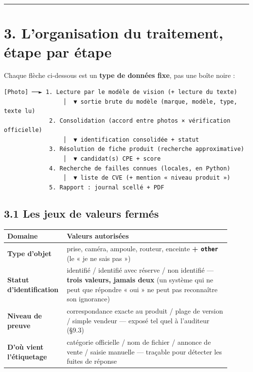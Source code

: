 \documentclass[11pt,a4paper]{article}
\begin{document}
\medskip\hrule\medskip
\section*{3. L'organisation du traitement, étape par étape}
Chaque flèche ci-dessous est un \textbf{type de données fixe}, pas une boîte noire :

\begin{Verbatim}[fontsize=\small]
[Photo] ──► 1. Lecture par le modèle de vision (+ lecture du texte)
                 │  ▼ sortie brute du modèle (marque, modèle, type, texte lu)
             2. Consolidation (accord entre photos × vérification officielle)
                 │  ▼ identification consolidée + statut
             3. Résolution de fiche produit (recherche approximative)
                 │  ▼ candidat(s) CPE + score
             4. Recherche de failles connues (locales, en Python)
                 │  ▼ liste de CVE (+ mention « niveau produit »)
             5. Rapport : journal scellé + PDF
\end{Verbatim}
\subsection*{3.1 Les jeux de valeurs fermés}
\sloppy
\begin{longtable}{|p{0.200\linewidth}|p{0.711\linewidth}|}
\hline
\textbf{Domaine} & \textbf{Valeurs autorisées} \\ \hline
\endhead
\textbf{Type d'objet} & prise, caméra, ampoule, routeur, enceinte \textbf{+ \texttt{other}} (le « je ne sais pas ») \\ \hline
\textbf{Statut d'identification} & identifié / identifié avec réserve / non identifié — \textbf{trois valeurs, jamais deux} (un système qui ne peut que répondre « oui » ne peut pas reconnaître son ignorance) \\ \hline
\textbf{Niveau de preuve} & correspondance exacte au produit / plage de version / simple vendeur — exposé tel quel à l'auditeur (§9.3) \\ \hline
\textbf{D'où vient l'étiquetage} & catégorie officielle / nom de fichier / annonce de vente / saisie manuelle — traçable pour détecter les fuites de réponse \\ \hline
\end{longtable}
\end{document}
